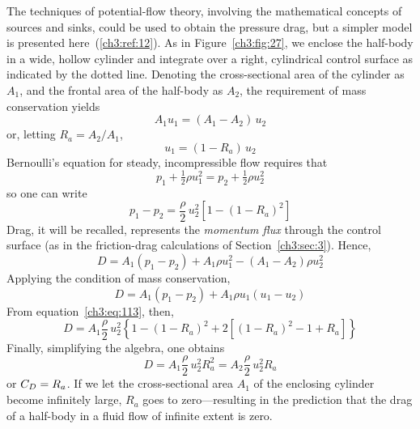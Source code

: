 The techniques of potential-flow theory, involving the mathematical concepts
of sources and sinks, could be used to obtain the pressure drag, but a simpler
model is presented here~(\ref{ch3:ref:12}). As in Figure~\ref{ch3:fig:27}, we
enclose the half-body in a wide, hollow cylinder and integrate over a right,
cylindrical control surface as indicated by the dotted line. Denoting the
cross-sectional area of the cylinder as $A_1$, and the frontal area of the
half-body as $A_2$, the requirement of mass conservation yields
\begin{equation}\label{ch3:eq:111}
A_1 u_1 = (A_1 - A_2)\,u_2
\end{equation}
or, letting $R_a = A_2/A_1$,
\begin{equation}\label{ch3:eq:112}
u_1 = (1 - R_a)\,u_2
\end{equation}
Bernoulli's equation for steady, incompressible flow requires that
\begin{equation}\label{ch3:eq:113}
p_1 + \tfrac{1}{2}\rho u_1^2 = p_2 + \tfrac{1}{2}\rho u_2^2
\end{equation}
so one can write
\begin{equation}\label{ch3:eq:114}
p_1 - p_2 = \frac{\rho}{2}\,u_2^2\left[1 - (1 - R_a)^2\right]
\end{equation}
Drag, it will be recalled, represents the \emph{momentum flux} through the
control surface (as in the friction-drag calculations of
Section~\ref{ch3:sec:3}). Hence,
\begin{equation}\label{ch3:eq:115}
D = A_1(p_1 - p_2) + A_1\rho u_1^2 - (A_1 - A_2)\rho u_2^2
\end{equation}
Applying the condition of mass conservation,
\begin{equation}\label{ch3:eq:116}
D = A_1(p_1 - p_2) + A_1\rho u_1(u_1 - u_2)
\end{equation}
From equation~\eqref{ch3:eq:113}, then,
\begin{equation}\label{ch3:eq:117}
D = A_1\frac{\rho}{2}\,u_2^2\left\{1 - (1 - R_a)^2
  + 2\left[(1 - R_a)^2 - 1 + R_a\right]\right\}
\end{equation}
Finally, simplifying the algebra, one obtains
\begin{equation}\label{ch3:eq:118}
D = A_1\frac{\rho}{2}\,u_2^2 R_a^2 = A_2\frac{\rho}{2}\,u_2^2 R_a
\end{equation}
or $C_{D} = R_a$. If we let the cross-sectional area $A_1$ of the enclosing
cylinder become infinitely large, $R_a$ goes to zero---resulting in the
prediction that the drag of a half-body in a fluid flow of infinite extent is
zero.

